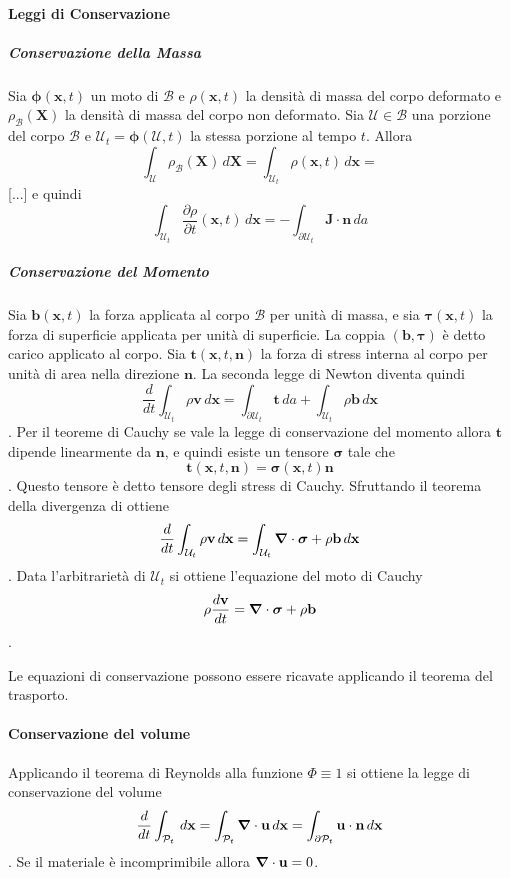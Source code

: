 \paragraph{Leggi di Conservazione}
\subparagraph{Conservazione della Massa}
Sia $\boldsymbol{\phi}(\mathbf{x},t)$ un moto di $\mathcal{B}$ e $\rho(\mathbf{x},t)$ la densità di massa del corpo deformato e $\rho_{\mathcal{B}}(\mathbf{X})$ la densità di massa del corpo non deformato. 
Sia $\mathcal{U}\in\mathcal{B}$ una porzione del corpo $\mathcal{B}$ e  $\mathcal{U}_t=\boldsymbol{\phi}(\mathcal{U},t)$ la stessa porzione al tempo $t$. Allora 
$$\int_{\mathcal{U}}\rho_{\mathcal{B}}(\mathbf{X})\, d\mathbf{X} = \int_{\mathcal{U}_t}\rho(\mathbf{x},t)\, d\mathbf{x} = $$
[...] e quindi
$$\int_{\mathcal{U}_t}\frac{\partial\rho}{\partial t}(\mathbf{x},t)\, d\mathbf{x} =  -\int_{\partial\mathcal{U}_t} \mathbf{J} \cdot \mathbf{n} \, da$$
\subparagraph{Conservazione del Momento}
Sia $\mathbf{b}(\mathbf{x},t)$ la forza applicata al corpo $\mathcal{B}$ per unità di massa, e sia $\boldsymbol{\tau}(\mathbf{x},t)$ la forza di superficie applicata per unità di superficie. La coppia $(\mathbf{b},\boldsymbol{\tau})$ è detto carico applicato al corpo. Sia $\mathbf{t}(\mathbf{x},t,\mathbf{n})$ la forza di stress interna al corpo per unità di area nella direzione $\mathbf{n}$. La seconda legge di Newton diventa quindi
$$\frac{d}{dt}\int_{\mathcal{U}_t}\rho\mathbf{v}\, d\mathbf{x} = \int_{\partial \mathcal{U}_t}\mathbf{t}\, da + \int_{\mathcal{U}_t}\rho\mathbf{b}\, d\mathbf{x} $$.
Per il teoreme di Cauchy se vale la legge di conservazione del momento allora $\mathbf{t}$ dipende linearmente da  $\mathbf{n}$, e quindi esiste un tensore $\boldsymbol{\sigma}$ tale che 
$$\mathbf{t}(\mathbf{x},t,\mathbf{n})= \boldsymbol{\sigma}(\mathbf{x},t)\mathbf{n}$$. Questo tensore è detto tensore degli stress di Cauchy. Sfruttando il teorema della divergenza di ottiene
$$\frac{d}{dt}\int_{\mathcal{U}_t}\rho\mathbf{v}\, d\mathbf{x} = \int_{\mathcal{U}_t}\boldsymbol{\nabla}\cdot\boldsymbol{\sigma}+\rho\mathbf{b}\, d\mathbf{x} $$.
Data l'arbitrarietà di ${\mathcal{U}_t}$ si ottiene l'equazione del moto di Cauchy
$$\rho\frac{d\mathbf{v}}{dt}=\boldsymbol{\nabla}\cdot\boldsymbol{\sigma}+\rho\mathbf{b}$$. 

Le equazioni di conservazione possono essere ricavate applicando il teorema del trasporto.

\paragraph{Conservazione del volume}
Applicando il teorema di Reynolds alla funzione $\Phi \equiv 1$ si ottiene la legge di conservazione del volume
$$\frac{d}{dt}\int_{\mathcal{P}_t}\,d\mathbf{x}=\int_{\mathcal{P}_t}\boldsymbol{\nabla}\cdot\mathbf{u}\,d\mathbf{x}=\int_{\partial\mathcal{P}_t}\mathbf{u}\cdot\mathbf{n}\,d\mathbf{x} $$.
Se il materiale è incomprimibile allora $\boldsymbol{\nabla}\cdot\mathbf{u}=0$.

